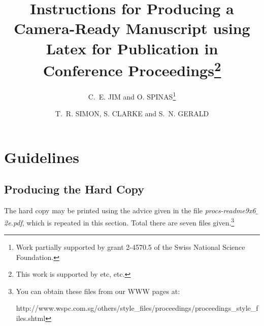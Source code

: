 \documentclass{ws-procs9x6}
\begin{document}
\title{Instructions for Producing a Camera-Ready Manuscript 
using Latex for Publication in Conference 
Proceedings\footnote{\uppercase{T}his work is supported by etc, etc.}}

\author{C.~E. JIM and O. SPINAS\footnote{\uppercase{W}ork partially
supported by grant 2-4570.5 of the \uppercase{S}wiss 
\uppercase{N}ational \uppercase{S}cience \uppercase{F}oundation.}}

\address{World Scientific Publishing Co., Inc, \\
1060 Main Street, \\ 
River Edge, NJ 07661, USA\\ 
E-mail: wspc@wspc.com}

\author{T.~R. SIMON, S. CLARKE and S.~N. GERALD}

\address{World Scientific Publishing Co Ltd, \\ 
57 Shelton Street, \\
London WC2H 9HE, England\\
E-mail: wspc@wspc.ox.uk}  

\maketitle


\section{Guidelines}
\subsection{Producing the Hard Copy}\label{subsec:prod}
The hard copy may be printed using the advice given in the file
{\em procs-readme9x6$\_$2e.pdf}, which is repeated in this section. 
Total there are seven files given.\footnote{You can obtain these files 
from our WWW pages at:

{\sf http://www.wspc.com.sg/others/style\_files/proceedings/proceedings\_style\_files.shtml}}
\end{document}
